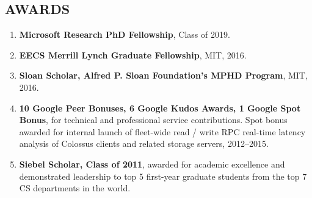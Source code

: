 \documentclass[centered,overlapped]{res}
\begin{document}
\begin{resume}

%

\section{AWARDS}

\begin{enumerate}
  \item \textbf{Microsoft Research PhD Fellowship}, Class of 2019.
  \item \textbf{EECS Merrill Lynch Graduate Fellowship}, MIT, 2016.
  \item \textbf{Sloan Scholar, Alfred P. Sloan Foundation's MPHD Program}, MIT, 2016.
  \item \textbf{10 Google Peer Bonuses, 6 Google Kudos Awards, 1 Google Spot Bonus}, for technical and professional service contributions.  Spot bonus awarded for internal launch of fleet-wide read / write RPC real-time latency analysis of Colossus clients and related storage servers, 2012--2015.
  \item \textbf{Siebel Scholar, Class of 2011}, awarded for academic excellence and demonstrated leadership to top 5 first-year graduate students from the top 7 CS departments in the world.
\end{enumerate}


\end{resume}
\end{document}
